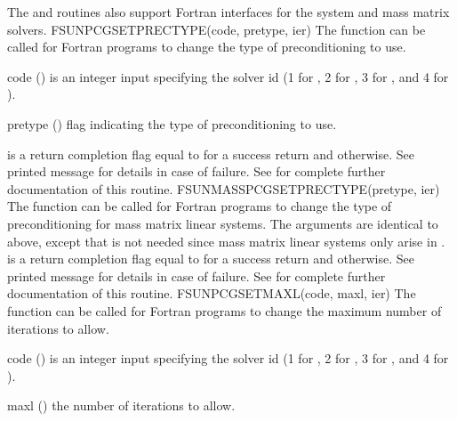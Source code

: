 %
%
The  and
 routines also support Fortran
interfaces for the system and mass matrix solvers.
%
%
{
  FSUNPCGSETPRECTYPE(code, pretype, ier)
}
{
  The function  can be called for Fortran
  programs to change the type of preconditioning to use.
}
{
  \begin{args}[pretype]
  \item[code] ()
    is an integer input specifying the solver id (1 for {\cvode}, 2
    for {\ida}, 3 for {\kinsol}, and 4 for {\arkode}).
  \item[pretype] ()
    flag indicating the type of preconditioning to use.
  \end{args}
}
{
   is a  return completion flag equal to  for a success
  return and  otherwise. See printed message for details in case
  of failure.
}
{
  See  for complete further documentation of
  this routine.
}
%
%
{
  FSUNMASSPCGSETPRECTYPE(pretype, ier)
}
{
  The function  can be called for Fortran
  programs to change the type of preconditioning for mass matrix
  linear systems.
}
{
  The arguments are identical to  above,
  except that  is not needed since mass matrix linear systems
  only arise in {\arkode}.
}
{
   is a  return completion flag equal to  for a success
  return and  otherwise. See printed message for details in case
  of failure.
}
{
  See  for complete further documentation of
  this routine.
}
%
%
{
  FSUNPCGSETMAXL(code, maxl, ier)
}
{
  The function  can be called for Fortran
  programs to change the maximum number of iterations to allow.
}
{
  \begin{args}[maxl]
  \item[code] ()
    is an integer input specifying the solver id (1 for {\cvode}, 2
    for {\ida}, 3 for {\kinsol}, and 4 for {\arkode}).
  \item[maxl] ()
    the number of iterations to allow.
  \end{args}
}
